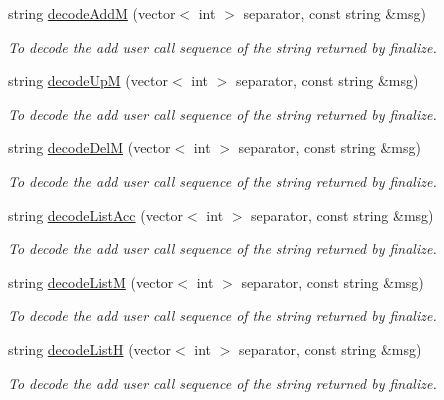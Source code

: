 \begin{DoxyCompactItemize}
string \hyperlink{classUMSMapper_a8b40c596d15368717b8a62a00d80df22}{decodeAddM} (vector$<$ int $>$ separator, const string \&msg)
\begin{DoxyCompactList}\small\item\em To decode the add user call sequence of the string returned by finalize. \item\end{DoxyCompactList}\item 
string \hyperlink{classUMSMapper_a11c776ef36bfe7237e920dfdd3c0c1ec}{decodeUpM} (vector$<$ int $>$ separator, const string \&msg)
\begin{DoxyCompactList}\small\item\em To decode the add user call sequence of the string returned by finalize. \item\end{DoxyCompactList}\item 
string \hyperlink{classUMSMapper_a8b218eb1620678b625db8444dab8226c}{decodeDelM} (vector$<$ int $>$ separator, const string \&msg)
\begin{DoxyCompactList}\small\item\em To decode the add user call sequence of the string returned by finalize. \item\end{DoxyCompactList}\item 
string \hyperlink{classUMSMapper_aca69a6e37499b1e2536521048ff40403}{decodeListAcc} (vector$<$ int $>$ separator, const string \&msg)
\begin{DoxyCompactList}\small\item\em To decode the add user call sequence of the string returned by finalize. \item\end{DoxyCompactList}\item 
string \hyperlink{classUMSMapper_af1a5337f43f288ba2f922f9876b8e0f8}{decodeListM} (vector$<$ int $>$ separator, const string \&msg)
\begin{DoxyCompactList}\small\item\em To decode the add user call sequence of the string returned by finalize. \item\end{DoxyCompactList}\item 
string \hyperlink{classUMSMapper_a54ef53fc918cfacdeda213fafdcc76de}{decodeListH} (vector$<$ int $>$ separator, const string \&msg)
\begin{DoxyCompactList}\small\item\em To decode the add user call sequence of the string returned by finalize. \item\end{DoxyCompactList}\item 

\end{DoxyCompactItemize}
